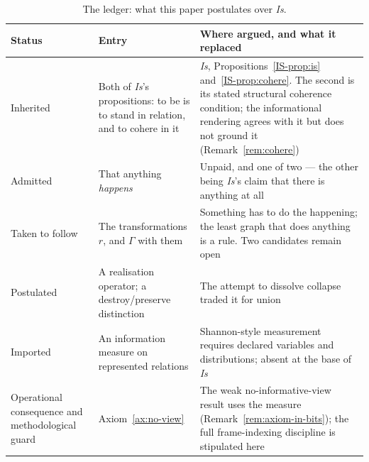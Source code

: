 \documentclass[11pt,a4paper]{article}
\theoremstyle{remark}\newtheorem{remark}[definition]{Remark}
\begin{document}
\begin{table}[htbp]\centering\small
\caption{The ledger: what this paper postulates over \emph{Is}.}\label{tab:ledger}
\begin{tabular}{@{}p{}p{}p{}@{}}
\toprule
\textbf{Status} & \textbf{Entry} & \textbf{Where argued, and what it replaced}\\
\midrule
Inherited &
Both of \emph{Is}'s propositions: to be is to stand in relation, and to cohere in it &
\emph{Is}, Propositions~\ref{IS-prop:is} and~\ref{IS-prop:cohere}. The second is its stated structural coherence condition; the informational rendering agrees with it but does not ground it (Remark~\ref{rem:cohere})\\[2pt]
Admitted &
That anything \emph{happens} &
Unpaid, and one of two --- the other being \emph{Is}'s claim that there is anything at all\\[2pt]
Taken to follow &
The transformations $r$, and $\Gamma$ with them &
Something has to do the happening; the least graph that does anything is a rule. Two candidates remain open\\[2pt]
Postulated &
A realisation operator; a destroy\slash preserve distinction &
The attempt to dissolve collapse traded it for union\\[2pt]
Imported &
An information measure on represented relations &
Shannon-style measurement requires declared variables and distributions; absent at the base of \emph{Is}\\[2pt]
Operational consequence and methodological guard &
Axiom~\ref{ax:no-view} &
The weak no-informative-view result uses the measure (Remark~\ref{rem:axiom-in-bits}); the full frame-indexing discipline is stipulated here\\
\bottomrule
\end{tabular}
\end{table}
\end{document}
